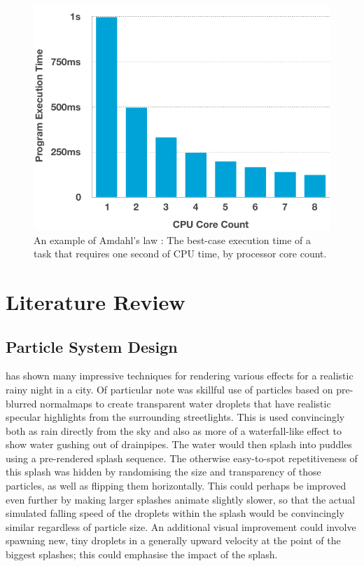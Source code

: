 \documentclass[11pt, a4paper, twocolumn]{article}
\begin{document}
\begin{figure}[h]
\includegraphics[width=\linewidth]{cpu_cores}
\caption{An example of Amdahl's law \citep{Rodgers1985}: The best-case execution time of a task that requires one second of CPU time, by processor core count.}
\label{fig:cpu_cores}
\end{figure}


\section{Literature Review}


\subsection{Particle System Design}
\citet{Tatarchuk2006} has shown many impressive techniques for rendering various effects for a realistic rainy night in a city. Of particular note was skillful use of particles based on pre-blurred normalmaps to create transparent water droplets that have realistic specular highlights from the surrounding streetlights. This is used convincingly both as rain directly from the sky and also as more of a waterfall-like effect to show water gushing out of drainpipes. The water would then splash into puddles using a pre-rendered splash sequence. The otherwise easy-to-spot repetitiveness of this splash was hidden by randomising the size and transparency of those particles, as well as flipping them horizontally. This could perhaps be improved even further by making larger splashes animate slightly slower, so that the actual simulated falling speed of the droplets within the splash would be convincingly similar regardless of particle size. An additional visual improvement could involve spawning new, tiny droplets in a generally upward velocity at the point of the biggest splashes; this could emphasise the impact of the splash. %
\end{document}
